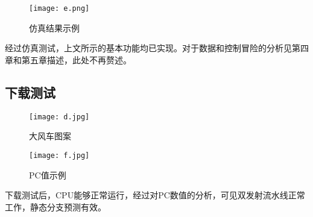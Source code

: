 \documentclass{article}
\begin{document}
        \begin{figure}[ht]
            \centering
            \texttt{[image: e.png]}
            \caption{仿真结果示例}
        \end{figure}
        经过仿真测试，上文所示的基本功能均已实现。对于数据和控制冒险的分析见第四章和第五章描述，此处不再赘述。
        \subsection{下载测试}
        \begin{figure}[ht]
            \centering
            \texttt{[image: d.jpg]}
            \caption{大风车图案}
            \texttt{[image: f.jpg]}
            \caption{PC值示例}
        \end{figure}
        \par{}
        下载测试后，CPU能够正常运行，经过对PC数值的分析，可见双发射流水线正常工作，静态分支预测有效。
    \newpage{}
\end{document}
